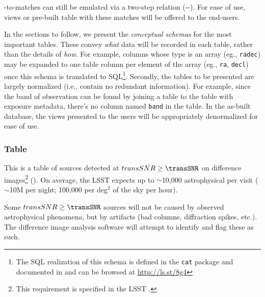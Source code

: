 \documentclass[SE,lsstdraft,toc]{lsstdoc}
\begin{document}
\DIASource-to-\Object matches can still be emulated via a two-step relation (\DIASource-\DIAObject-\Object). For ease of use, views or pre-built table with these matches will be offered to the end-users.


In the sections to follow, we present the \emph{conceptual schemas} for the most important \PPDB tables. These convey \emph{what} data will be recorded in each table, rather than the details of \emph{how}. For example, columns whose type is an array (eg., \texttt{radec}) may be expanded to one table column per element of the array (eg., \texttt{ra}, \texttt{decl}) once this schema is translated to SQL\footnote{The SQL realization of this schema is defined in the \texttt{cat} package and documented in  and can be browsed at \url{http://ls.st/8g4}}. Secondly, the tables to be presented are largely normalized (i.e., contain no redundant information). For example, since the band of observation can be found by joining a \DIASource table to the table with exposure metadata, there's no column named \texttt{band} in the \DIASource table. In the as-built database, the views presented to the users will be appropriately denormalized for ease of use.

\subsubsection{\DIASource Table}

This is a table of sources detected at $transSNR \geq \transSNR$  on difference images\footnote{This requirement is specified in the LSST \SRD.} (\DIASources).
On average, the LSST \SRD expects
up to
$\sim$10,000 astrophysical \DIASources per visit ($\sim$10M per night; 100,000 per deg$^2$
of the sky per hour).

Some $transSNR \geq \transSNR$ sources will not be caused by observed astrophysical phenomena, but by artifacts (bad columns, diffraction spikes, etc.). The difference image analysis software will attempt to identify and flag these as such.
\end{document}
